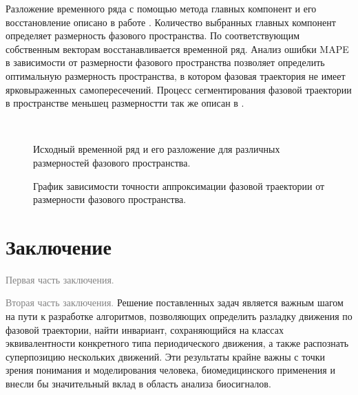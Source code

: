 \documentclass[12pt, twoside]{article}
\begin{document}
Разложение временного ряда с помощью метода главных компонент и его восстановление описано в работе \cite{motrenko2015extracting}. Количество выбранных главных компонент определяет размерность фазового пространства. По соответствующим собственным векторам восстанавливается временной ряд. Анализ ошибки MAPE в зависимости от размерности фазового пространства позволяет определить оптимальную размерность пространства, в котором фазовая траектория не имеет ярковыраженных самопересечений. Процесс сегментирования фазовой траектории в пространстве меньшец размерностти так же описан в \cite{motrenko2015extracting}.
    
    \begin{figure}[ht]
        \\
        \caption{Исходный временной ряд и его разложение для различных размерностей фазового пространства.}
        \label{fg:mod}
    \end{figure}

    
    \begin{figure}[ht]
	    \caption{График зависимости точности аппроксимации фазовой траектории от размерности фазового пространства.}
    \end{figure}
    
\newpage

\section{Заключение}
\textcolor{gray}{Первая часть заключения.}

\textcolor{gray}{Вторая часть заключения.} Решение поставленных задач является важным шагом на пути к разработке алгоритмов, позволяющих определить разладку движения по фазовой траектории, найти инвариант, сохраняющийся на классах эквивалентности конкретного типа периодического движения, а также распознать суперпозицию нескольких движений. Эти результаты крайне важны с точки зрения понимания и моделирования человека, биомедицинского применения и внесли бы значительный вклад в область анализа биосигналов.






\end{document}
